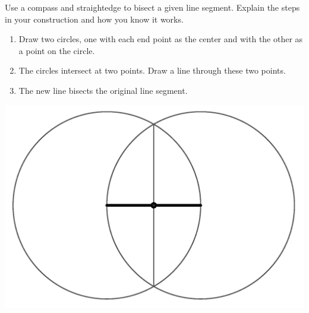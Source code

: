\documentclass[nooutcomes]{ximera}
\begin{document}
\begin{problem}
Use a compass and straightedge to bisect a given line segment. Explain the steps in your construction and how you know it works.
\begin{freeResponse}
\begin{hint}%
\begin{enumerate}
\item Draw two circles, one with each end point as the center and with the other as a point on the circle. 
\item The circles intersect at two points.  Draw a line through 
these two points.
\item The new line bisects the original line segment.
\end{enumerate}
\begin{image}
\includegraphics{bisectseg.png}
\end{image}
\end{hint}
\end{freeResponse}
\end{problem}
\end{document}
